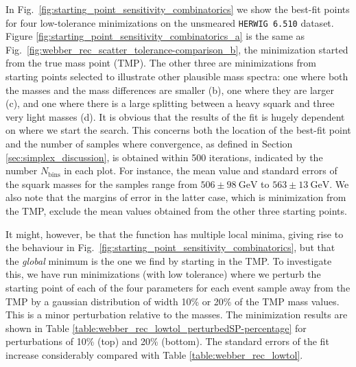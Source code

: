 \documentclass[twoside,english]{uiofysmaster}
\begin{document}
In Fig.\ \ref{fig:starting_point_sensitivity_combinatorics} we show the best-fit points for four low-tolerance minimizations on the unsmeared {\tt HERWIG 6.510} dataset. Figure \ref{fig:starting_point_sensitivity_combinatorics_a} is the same as Fig.\ \ref{fig:webber_rec_scatter_tolerance-comparison_b}, the minimization started from the true mass point (TMP). The other three are minimizations from starting points selected to illustrate other plausible mass spectra: one where both the masses and the mass differences are smaller (b), one where they are larger (c), and one where there is a large splitting between a heavy squark and three very light masses (d). It is obvious that the results of the fit is hugely dependent on where we start the search. This concerns both the location of the best-fit point and the number of samples where convergence, as defined in Section \ref{sec:simplex_discussion}, is obtained within 500 iterations, indicated by the number $N_\mathrm{bins}$ in each plot. For instance, the mean value and standard errors of the squark masses for the samples range from $506 \pm 98~\mathrm{GeV}$ to $563 \pm 13~\mathrm{GeV}$. We also note that the margins of error in the latter case, which is minimization from the TMP, exclude the mean values obtained from the other three starting points.

It might, however, be that the function has multiple local minima, giving rise to the behaviour in Fig.\ \ref{fig:starting_point_sensitivity_combinatorics}, but that the {\it global} minimum is the one we find by starting in the TMP. To investigate this, we have run minimizations (with low tolerance) where we perturb the starting point of each of the four parameters for each event sample away from the TMP by a gaussian distribution of width 10\% or 20\% of the TMP mass values. This is a minor perturbation relative to the masses. The minimization results are shown in Table \ref{table:webber_rec_lowtol_perturbedSP-percentage} for perturbations of 10\% (top) and 20\% (bottom). The standard errors of the fit increase considerably compared with Table \ref{table:webber_rec_lowtol}. 
\end{document}
